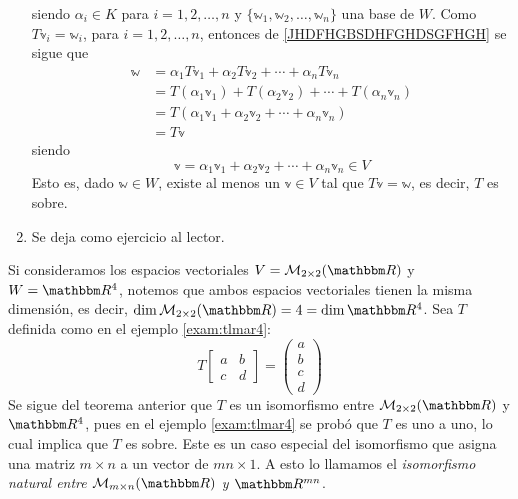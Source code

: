 \begin{theorem}
\begin{enumerate}[label=\roman*)]
        siendo $\alpha_i \in K$ para $i = 1,  2,  \dots,  n$ y $\{ \mathbb{w}_1,  \mathbb{w}_2,  \dots, \mathbb{w}_n \}$ una base de $W$. Como $T\mathbb{v}_i = \mathbb{w}_i$, para $i = 1,  2,  \dots,  n$, entonces de \eqref{JHDFHGBSDHFGHDSGFHGH} se sigue que
        \begin{align*}
            \mathbb{w} & = \alpha_1T\mathbb{v}_1 + \alpha_2T\mathbb{v}_2 + \cdots + \alpha_nT\mathbb{v}_n \\
            & = T(\alpha_1\mathbb{v}_1) + T(\alpha_2\mathbb{v}_2) + \cdots + T(\alpha_n\mathbb{v}_n) \\
            & = T(\alpha_1\mathbb{v}_1 + \alpha_2\mathbb{v}_2 + \cdots + \alpha_n\mathbb{v}_n) \\
            & = T\mathbb{v}
        \end{align*}
        siendo
        $$\mathbb{v} = \alpha_1\mathbb{v}_1 + \alpha_2\mathbb{v}_2 + \cdots + \alpha_n\mathbb{v}_n \in V$$
        Esto es, dado $\mathbb{w} \in W$, existe al menos un $\mathbb{v} \in V$ tal que $T\mathbb{v} = \mathbb{w}$, es decir, $T$ es sobre.
        \item Se deja como ejercicio al lector.
    \end{enumerate}
\end{theorem}

\begin{example}
    Si consideramos los espacios vectoriales $V = \mathcal{M}_{2 \times 2}(\RR)$ y $W = \RR[4]$, notemos que ambos espacios vectoriales tienen la misma dimensión, es decir, $\Dim \mathcal{M}_{2 \times 2}(\RR)= 4 = \Dim \RR[4]$. Sea $T$ definida como en el ejemplo \ref{exam:tlmar4}:
    $$T \begin{bmatrix}
        a & b \\
        c & d
    \end{bmatrix} = \begin{pmatrix}
        a \\
        b \\
        c \\
        d
    \end{pmatrix}$$
    Se sigue del teorema anterior que $T$ es un isomorfismo entre $\mathcal{M}_{2 \times 2}(\RR)$ y $\RR[4]$, pues en el ejemplo \ref{exam:tlmar4} se probó que $T$ es uno a uno, lo cual implica que $T$ es sobre. Este es un caso especial del isomorfismo que asigna una matriz $m \times n$ a un vector de $mn \times 1$. A esto lo llamamos el \emph{isomorfismo natural entre $\mathcal{M}_{m \times n}(\RR)$ y $\RR[mn]$}.
\end{example}

